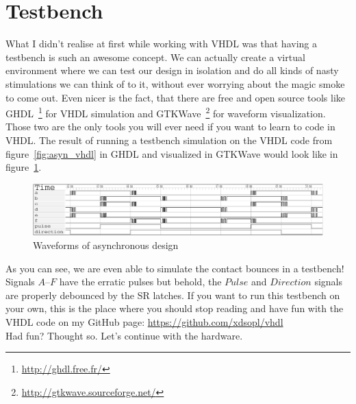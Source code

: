 \documentclass[a4paper]{article}
\begin{document}
\section{Testbench}
What I didn't realise at first while working with VHDL was that having a testbench is such an awesome concept.
We can actually create a virtual environment where we can test our design in isolation and do all kinds of nasty stimulations we can think of to it, without ever worrying about the magic smoke to come out.
Even nicer is the fact, that there are free and open source tools like GHDL~\footnote{\url{http://ghdl.free.fr/}} for VHDL simulation and GTKWave~\footnote{\url{http://gtkwave.sourceforge.net/}} for waveform visualization.
Those two are the only tools you will ever need if you want to learn to code in VHDL.
The result of running a testbench simulation on the VHDL code from figure~\ref{fig:asyn_vhdl} in GHDL and visualized in GTKWave would look like in figure~\ref{fig:asyn_wave}.
\begin{figure}[h]
\centering
\includegraphics[width=\textwidth]{asynchronous_quadrature_decoder_gtkwave.pdf}
\caption{Waveforms of asynchronous design}
\label{fig:asyn_wave}
\end{figure}
As you can see, we are even able to simulate the contact bounces in a testbench!
Signals $A$--$F$ have the erratic pulses but behold, the $Pulse$ and $Direction$ signals are properly debounced by the SR latches.
If you want to run this testbench on your own, this is the place where you should stop reading and have fun with the VHDL code on my GitHub page: \url{https://github.com/xdsopl/vhdl}
\\Had fun? Thought so. Let's continue with the hardware.
\end{document}
